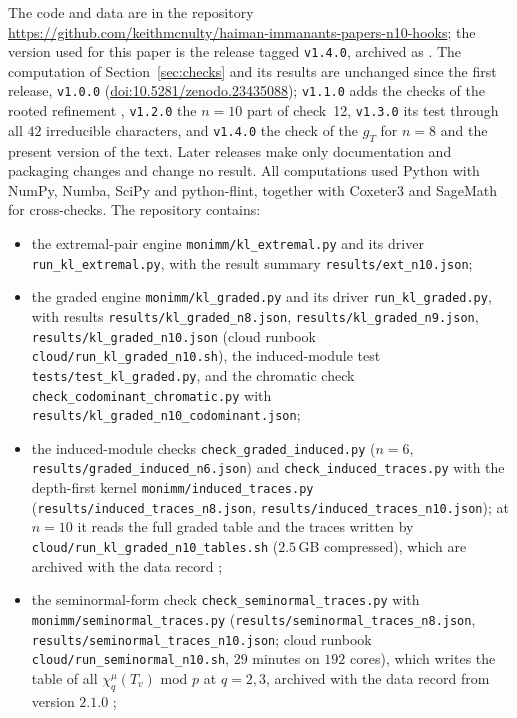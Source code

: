 \documentclass[11pt]{amsart}
\theoremstyle{definition}
\theoremstyle{remark}
\begin{document}
{\raggedright The code and data are in the repository \url{https://github.com/keithmcnulty/haiman-immanants-papers-n10-hooks}; the version used for this paper is the release tagged \texttt{v1.4.0}, archived as \cite{McNcode}. The computation of Section~\ref{sec:checks} and its results are unchanged since the first release, \texttt{v1.0.0} (\href{https://doi.org/10.5281/zenodo.23435088}{doi:10.5281/zenodo.23435088}); \texttt{v1.1.0} adds the checks of the rooted refinement \cite[Conj.~10.2]{McN}, \texttt{v1.2.0} the $n=10$ part of check~12, \texttt{v1.3.0} its test through all $42$ irreducible characters, and \texttt{v1.4.0} the check of the $g_T$ for $n=8$ and the present version of the text. Later releases make only documentation and packaging changes and change no result. All computations used Python with NumPy, Numba, SciPy and python-flint, together with \textsf{Coxeter3} \cite{Cox3} and SageMath for cross-checks. The repository contains:
\begin{itemize}
\item the extremal-pair engine \texttt{monimm/kl\_extremal.py} and its driver \texttt{run\_kl\_extremal.py}, with the result summary \texttt{results/ext\_n10.json};
\item the graded engine \texttt{monimm/kl\_graded.py} and its driver \texttt{run\_kl\_graded.py}, with results \texttt{results/kl\_graded\_n8.json}, \texttt{results/kl\_graded\_n9.json}, \texttt{results/kl\_graded\_n10.json} (cloud runbook \texttt{cloud/run\_kl\_graded\_n10.sh}), the induced-module test \texttt{tests/test\_kl\_graded.py}, and the chromatic check \texttt{check\_codominant\_chromatic.py} with \texttt{results/kl\_graded\_n10\_codominant.json};
\item the induced-module checks \texttt{check\_graded\_induced.py} ($n=6$, \texttt{results/graded\_induced\_n6.json}) and \texttt{check\_induced\_traces.py} with the depth-first kernel \texttt{monimm/induced\_traces.py} (\texttt{results/induced\_traces\_n8.json}, \texttt{results/induced\_traces\_n10.json}); at $n=10$ it reads the full graded table and the traces written by \texttt{cloud/run\_kl\_graded\_n10\_tables.sh} ($2.5$\,GB compressed), which are archived with the data record \cite{McNdata};
\item the seminormal-form check \texttt{check\_seminormal\_traces.py} with \texttt{monimm/seminormal\_traces.py} (\texttt{results/seminormal\_traces\_n8.json}, \texttt{results/seminormal\_traces\_n10.json}; cloud runbook \texttt{cloud/run\_seminormal\_n10.sh}, $29$ minutes on $192$ cores), which writes the table of all $\chi^\mu_q(T_v)$ mod $p$ at $q=2,3$, archived with the data record from version $2.1.0$ \cite{McNdata};

\end{itemize}}
\end{document}
